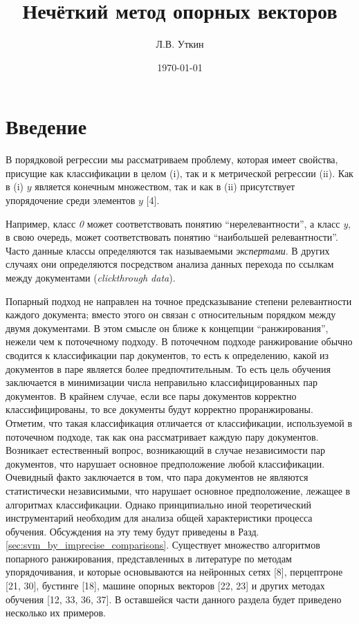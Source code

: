 \documentclass[12pt,a4paper,oneside]{article}
\title{Нечёткий метод опорных векторов}
\author{Л.В. Уткин}
\date{\today}
\begin{document}

\ApplyCommonPageStyle


\section{Введение}
\label{sec:introduction}

\par
В порядковой регрессии мы рассматриваем проблему, которая имеет свойства, присущие как классификации в целом (i), так и к метрической регрессии (ii). 
Как в (i) $y$ является конечным множеством, так и как в (ii) присутствует упорядочение среди элементов $y$ [4].

\par
Например, класс \emph{0} может соответствовать понятию ``нерелевантности'', а класс \emph{y}, в свою очередь, может  соответствовать понятию ``наибольшей релевантности''. 
Часто данные классы определяются так называемыми \emph{экспертами}. 
В других случаях они определяются посредством анализа данных перехода по ссылкам между документами (\emph{clickthrough data}).

\par
Попарный подход не направлен на точное предсказывание степени релевантности каждого документа; вместо этого он связан с относительным порядком между двумя документами. 
В этом смысле он ближе к концепции ``ранжирования'', нежели чем к поточечному подходу. 
В поточечном подходе ранжирование обычно сводится к классификации пар документов, то есть к определению, какой из документов в паре является более предпочтительным.
То есть цель обучения заключается в минимизации числа неправильно классифицированных пар документов. 
В крайнем случае, если все пары документов корректно классифицированы, то все документы будут корректно проранжированы. 
Отметим, что такая классификация отличается от классификации, используемой в поточечном подходе, так как она рассматривает каждую пару документов. 
Возникает естественный вопрос, возникающий в случае независимости пар документов, что нарушает основное предположение любой классификации. 
Очевидный факто заключается в том, что пара документов не являются статистически независимыми, что нарушает основное предположение, лежащее в алгоритмах классификации.  
Однако принципиально иной теоретический инструментарий необходим для анализа общей характеристики процесса обучения. 
Обсуждения на эту тему будут приведены в Разд. \ref{sec:svm_by_imprecise_comparisons}. 
Существует множество алгоритмов попарного ранжирования, представленных в литературе по методам упорядочивания, и которые основываются на нейронных сетях [8], перцептроне [21, 30], бустинге [18], машине опорных векторов [22, 23] и других методах обучения [12, 33, 36, 37].
В оставшейся части данного раздела будет приведено несколько их примеров. 
\end{document}
